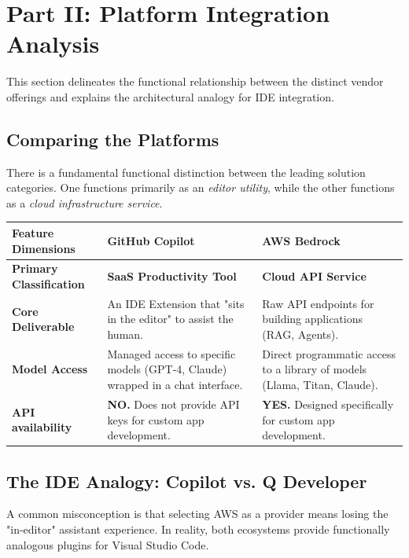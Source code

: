 \documentclass[10pt]{article}
\begin{document}
\section*{Part II: Platform Integration Analysis}

This section delineates the functional relationship between the distinct vendor offerings and explains the architectural analogy for IDE integration.

\subsection*{Comparing the Platforms}

There is a fundamental functional distinction between the leading solution categories. One functions primarily as an \textit{editor utility}, while the other functions as a \textit{cloud infrastructure service}.

\vspace{1em}
\noindent
\begin{tabular}{|p{}|p{}|p{}|}
\hline
\rowcolor{gray!15}
\textbf{Feature Dimensions} & \textbf{GitHub Copilot} & \textbf{AWS Bedrock} \\
\hline
\textbf{Primary Classification} & \textbf{SaaS Productivity Tool} & \textbf{Cloud API Service} \\
\hline
\textbf{Core Deliverable} & An IDE Extension that "sits in the editor" to assist the human. & Raw API endpoints for building applications (RAG, Agents). \\
\hline
\textbf{Model Access} & Managed access to specific models (GPT-4, Claude) wrapped in a chat interface. & Direct programmatic access to a library of models (Llama, Titan, Claude). \\
\hline
\textbf{API availability} & \textbf{NO.} Does not provide API keys for custom app development. & \textbf{YES.} Designed specifically for custom app development. \\
\hline
\end{tabular}

\subsection*{The IDE Analogy: Copilot vs. Q Developer}

A common misconception is that selecting AWS as a provider means losing the "in-editor" assistant experience. In reality, both ecosystems provide functionally analogous plugins for Visual Studio Code.
\end{document}
